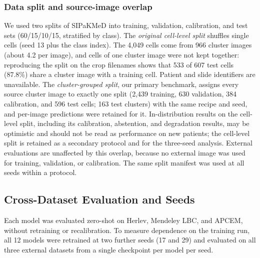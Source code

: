 \documentclass[12pt,letterpaper]{article}
\begin{document}
\subsubsection{Data split and source-image overlap}
\label{sec:split}
We used two splits of SIPaKMeD into training, validation, calibration, and test sets (60/15/10/15, stratified by class). The \emph{original cell-level split} shuffles single cells (seed 13 plus the class index). The 4,049 cells come from 966 cluster images (about 4.2 per image), and cells of one cluster image were not kept together: reproducing the split on the crop filenames shows that 533 of 607 test cells (87.8\%) share a cluster image with a training cell. Patient and slide identifiers are unavailable. The \emph{cluster-grouped split}, our primary benchmark, assigns every source cluster image to exactly one split (2,439 training, 630 validation, 384 calibration, and 596 test cells; 163 test clusters) with the same recipe and seed, and per-image predictions were retained for it. In-distribution results on the cell-level split, including its calibration, abstention, and degradation results, may be optimistic and should not be read as performance on new patients; the cell-level split is retained as a secondary protocol and for the three-seed analysis. External evaluations are unaffected by this overlap, because no external image was used for training, validation, or calibration. The same split manifest was used at all seeds within a protocol.

\subsection{Cross-Dataset Evaluation and Seeds}
\label{sec:shift}
Each model was evaluated zero-shot on Herlev, Mendeley LBC, and APCEM, without retraining or recalibration. To measure dependence on the training run, all 12 models were retrained at two further seeds (17 and 29) and evaluated on all three external datasets from a single checkpoint per model per seed.
\end{document}
